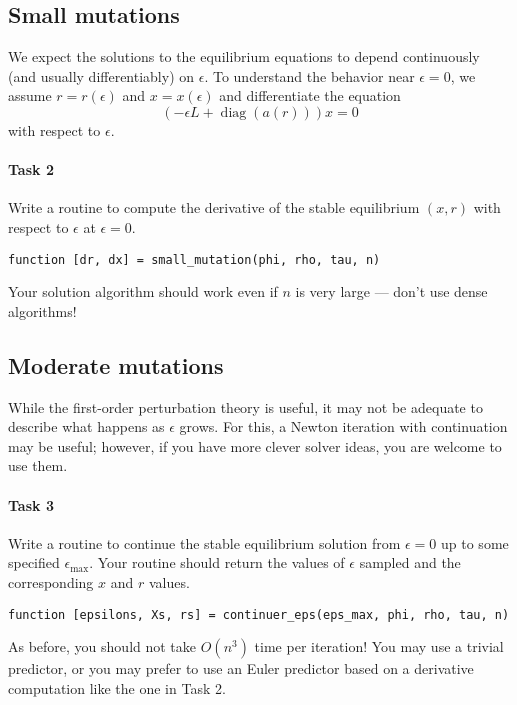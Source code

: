 \documentclass[12pt, leqno]{article} %
\begin{document}
\subsection{Small mutations}

We expect the solutions to the equilibrium equations to depend
continuously (and usually differentiably) on $\epsilon$.
To understand the behavior near $\epsilon = 0$, we assume
$r = r(\epsilon)$ and $x = x(\epsilon)$ and differentiate
the equation
\[
  \left( -\epsilon L + \operatorname{diag}(a(r)) \right) x = 0
\]
with respect to $\epsilon$.

\paragraph{Task 2}
Write a routine to compute the derivative of the stable
equilibrium $(x,r)$ with respect to $\epsilon$ at $\epsilon = 0$.
\begin{lstlisting}[frame=single]
function [dr, dx] = small_mutation(phi, rho, tau, n)
\end{lstlisting}
Your solution algorithm should work even if $n$ is very large ---
don't use dense algorithms!

\subsection{Moderate mutations}

While the first-order perturbation theory is useful, it may not
be adequate to describe what happens as $\epsilon$ grows.  For this,
a Newton iteration with continuation may be useful; however, if you
have more clever solver ideas, you are welcome to use them.

\paragraph{Task 3}
Write a routine to continue the stable equilibrium solution
from $\epsilon = 0$ up to some specified $\epsilon_{\max}$.
Your routine should return the values of $\epsilon$ sampled
and the corresponding $x$ and $r$ values.
\begin{lstlisting}[frame=single]
function [epsilons, Xs, rs] = continuer_eps(eps_max, phi, rho, tau, n)
\end{lstlisting}
As before, you should not take $O(n^3)$ time per iteration!  You may
use a trivial predictor, or you may prefer to use an Euler predictor
based on a derivative computation like the one in Task 2.
\end{document}
